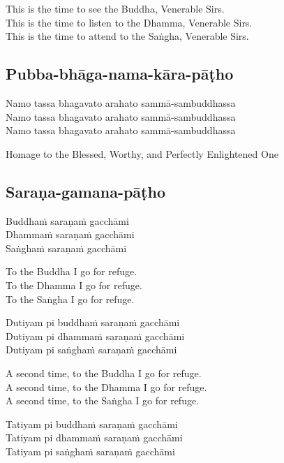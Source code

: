 \begin{english}
  This is the time to see the Buddha, Venerable Sirs.\\
  This is the time to listen to the Dhamma, Venerable Sirs.\\
  This is the time to attend to the Saṅgha, Venerable Sirs.
\end{english}

\suttaRef{[Thai]}

\subsection{Pubba-bhāga-nama-kāra-pāṭho}
\label{pubba-bhaga-nama-kara-patho}
Namo tassa bhagavato arahato sammā-sambuddhassa\\
Namo tassa bhagavato arahato sammā-sambuddhassa\\
Namo tassa bhagavato arahato sammā-sambuddhassa

\begin{english}
  Homage to the Blessed, Worthy, and Perfectly Enlightened One
\end{english}

\subsection{Saraṇa-gamana-pāṭho}
\label{sarana-gamana-patho}
Buddhaṁ saraṇaṁ gacchāmi\\
Dhammaṁ saraṇaṁ gacchāmi\\
Saṅghaṁ saraṇaṁ gacchāmi

\begin{english}
  To the Buddha I go for refuge.\\
  To the Dhamma I go for refuge.\\
  To the Saṅgha I go for refuge.
\end{english}

Dutiyam pi buddhaṁ saraṇaṁ gacchāmi\\
Dutiyam pi dhammaṁ saraṇaṁ gacchāmi\\
Dutiyam pi saṅghaṁ saraṇaṁ gacchāmi

\begin{english}
  A second time, to the Buddha I go for refuge.\\
  A second time, to the Dhamma I go for refuge.\\
  A second time, to the Saṅgha I go for refuge.
\end{english}

Tatiyam pi buddhaṁ saraṇaṁ gacchāmi\\
Tatiyam pi dhammaṁ saraṇaṁ gacchāmi\\
Tatiyam pi saṅghaṁ saraṇaṁ gacchāmi

